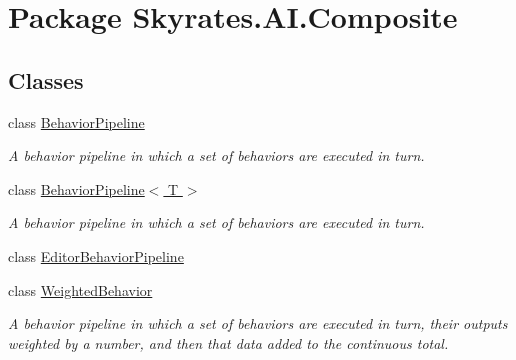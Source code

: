 \hypertarget{namespace_skyrates_1_1_a_i_1_1_composite}{\section{Package Skyrates.\-A\-I.\-Composite}
\label{namespace_skyrates_1_1_a_i_1_1_composite}
}
\subsection*{Classes}
\begin{DoxyCompactItemize}
\item 
class \hyperlink{class_skyrates_1_1_a_i_1_1_composite_1_1_behavior_pipeline}{Behavior\-Pipeline}
\begin{DoxyCompactList}\small\item\em A behavior pipeline in which a set of behaviors are executed in turn. \end{DoxyCompactList}\item 
class \hyperlink{class_skyrates_1_1_a_i_1_1_composite_1_1_behavior_pipeline_3_01_t_01_4}{Behavior\-Pipeline$<$ T $>$}
\begin{DoxyCompactList}\small\item\em A behavior pipeline in which a set of behaviors are executed in turn. \end{DoxyCompactList}\item 
class \hyperlink{class_skyrates_1_1_a_i_1_1_composite_1_1_editor_behavior_pipeline}{Editor\-Behavior\-Pipeline}
\item 
class \hyperlink{class_skyrates_1_1_a_i_1_1_composite_1_1_weighted_behavior}{Weighted\-Behavior}
\begin{DoxyCompactList}\small\item\em A behavior pipeline in which a set of behaviors are executed in turn, their outputs weighted by a number, and then that data added to the continuous total. \end{DoxyCompactList}\end{DoxyCompactItemize}
